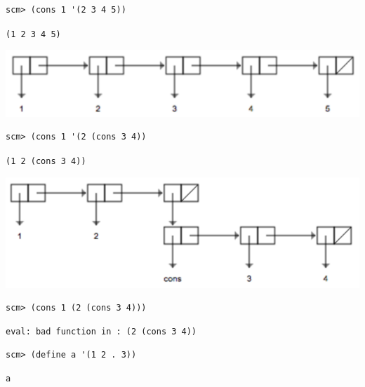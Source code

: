 \documentclass{exam}
\begin{document}
\begin{questions}
\begin{blocksection}
\begin{lstlisting}
scm> (cons 1 '(2 3 4 5))
\end{lstlisting}
\begin{solution}[0.25in]
\texttt{(1 2 3 4 5)}
\begin{center}
\includegraphics[scale=0.7]{9c}
\end{center}
\end{solution}

\begin{lstlisting}
scm> (cons 1 '(2 (cons 3 4))
\end{lstlisting}
\begin{solution}[0.25in]
\texttt{(1 2 (cons 3 4))}
\begin{center}
\includegraphics[scale=0.7]{9d}
\end{center}
\end{solution}

\begin{lstlisting}
scm> (cons 1 (2 (cons 3 4)))
\end{lstlisting}
\begin{solution}[.25in]
\begin{lstlisting}
eval: bad function in : (2 (cons 3 4))
\end{lstlisting}
\end{solution}
\end{blocksection}

\begin{blocksection}
\begin{lstlisting}
scm> (define a '(1 2 . 3))
\end{lstlisting}
\begin{solution}[.25in]
\begin{lstlisting}
a
\end{lstlisting}
\end{solution}


\end{blocksection}
\end{questions}
\end{document}
